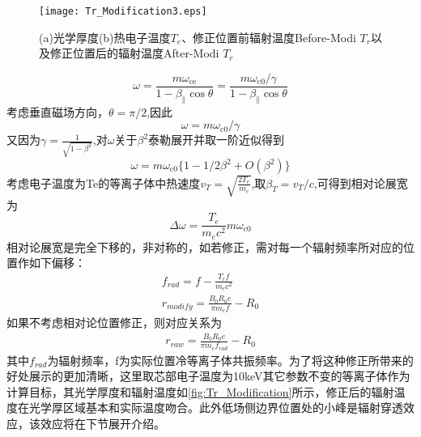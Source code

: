 \begin{figure}[H]
\centering
\texttt{[image: Tr\_Modification3.eps]}
\caption{\label{fig:Tr_Modification} (a)光学厚度(b)热电子温度$T_e$、修正位置前辐射温度Before-Modi $T_r$以及修正位置后的辐射温度After-Modi $T_r$}
\end{figure}
\begin{equation}
\omega=\frac{m \omega_{\mathrm{ce}}}{1-\beta_{\|} \cos \theta}=\frac{{m \omega_{\mathrm{c} 0}}/{\gamma}}{1-\beta_{\|} \cos \theta}
\end{equation}
考虑垂直磁场方向，$\theta=\pi/2$,因此
\begin{equation}
\omega=m \omega_{\mathrm{c} 0}/{\gamma}
\end{equation}
又因为$\gamma=\frac{1}{\sqrt{1-\beta^2}}$,对$\omega$关于$\beta^2$泰勒展开并取一阶近似得到
\begin{equation}
\omega=m \omega_{\mathrm{c} 0}\{1-1/2\beta^2+O(\beta^2)\}
\end{equation}
考虑电子温度为Te的等离子体中热速度$v_T=\sqrt{\frac{2T_e}{m_e}}$,取$\beta_T=v_T/c$,可得到相对论展宽为
\begin{equation}
\Delta\omega=\frac{T_e}{m_ec^2}m \omega_{\mathrm{c} 0}
\end{equation}
相对论展宽是完全下移的，非对称的，如若修正，需对每一个辐射频率所对应的位置作如下偏移：
\begin{align}
f_{rad}=f-\frac{T_r f}{m_ec^2}\\
r_{modify}=\frac{B_0R_0e}{\pi m_e f}-R_0
\end{align}
如果不考虑相对论位置修正，则对应关系为
\begin{align}
r_{raw}=\frac{B_0R_0e}{\pi m_e f_{rad}}-R_0
\end{align}
其中$f_{rad}$为辐射频率，f为实际位置冷等离子体共振频率。为了将这种修正所带来的好处展示的更加清晰，这里取芯部电子温度为10keV其它参数不变的等离子体作为计算目标，其光学厚度和辐射温度如\autoref{fig:Tr_Modification}所示，修正后的辐射温度在光学厚区域基本和实际温度吻合。此外低场侧边界位置处的小峰是辐射穿透效应，该效应将在下节展开介绍。
